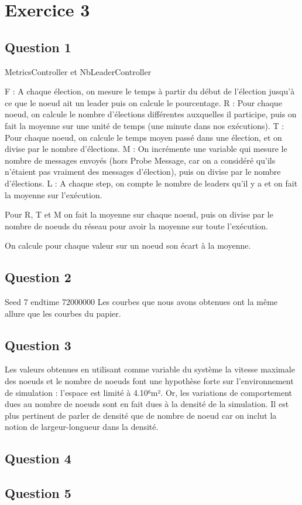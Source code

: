 \documentclass[paper=a4, fontsize=11pt]{article} %
\begin{document}
\newpage
\section{Exercice 3}

\subsection{Question 1}
MetricsController et NbLeaderController


F : A chaque élection, on mesure le temps à partir du début de l'élection jusqu'à ce que le noeud ait un leader puis on calcule le pourcentage. \newline
R : Pour chaque noeud, on calcule le nombre d'élections différentes auxquelles il participe, puis on fait la moyenne sur une unité de temps (une minute dans nos exécutions). \newline
T : Pour chaque noeud, on calcule le temps moyen passé dans une élection, et on divise par le nombre d'élections. \newline
M : On incrémente une variable qui mesure le nombre de messages envoyés (hors Probe Message, car on a considéré qu'ils n'étaient pas vraiment des messages d'élection), puis on divise par le nombre d'élections.
L : A chaque step, on compte le nombre de leaders qu'il y a et on fait la moyenne sur l'exécution.

Pour R, T et M on fait la moyenne sur chaque noeud, puis on divise par le nombre de noeuds du réseau pour avoir la moyenne sur toute l'exécution.

On calcule pour chaque valeur sur un noeud son écart à la moyenne.


\subsection{Question 2}
Seed 7
endtime 72000000
Les courbes que nous avons obtenues ont la même allure que les courbes du papier.


\subsection{Question 3}
Les valeurs obtenues en utilisant comme variable du système la vitesse maximale des noeuds et le nombre de noeuds font une hypothèse forte sur l'environnement de simulation : l'espace est limité à 4.10⁶m². Or, les variations de comportement dues au nombre de noeuds sont en fait dues à la densité de la simulation. 
Il est plus pertinent de parler de densité que de nombre de noeud car on inclut la notion de largeur-longueur dans la densité.

\subsection{Question 4}

\subsection{Question 5}
\end{document}
